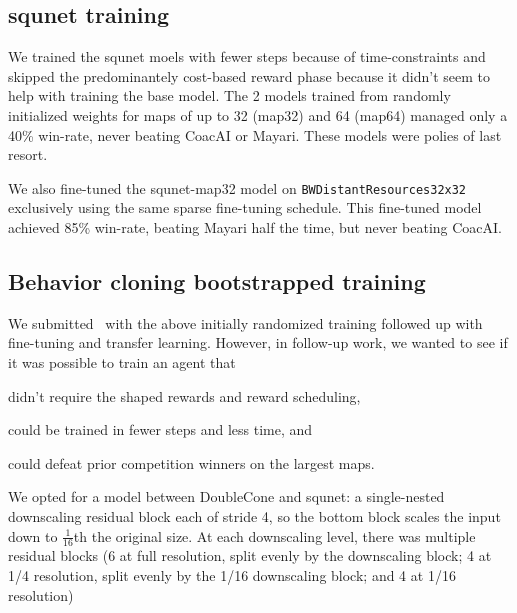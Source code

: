 \documentclass{article}
\begin{document}
\subsection{squnet training}
We trained the squnet moels with fewer steps because of time-constraints and skipped the
predominantely cost-based reward phase because it didn't seem to help with training the
base model. The 2 models trained from randomly initialized weights for maps of up to 32 (map32)
and 64 (map64) managed only a 40\% win-rate, never beating CoacAI or Mayari. These
models were polies of last resort.

We also fine-tuned the squnet-map32 model on \texttt{BWDistantResources32x32}
exclusively using the same sparse fine-tuning schedule. This fine-tuned model achieved
85\% win-rate, beating Mayari half the time, but never beating CoacAI.

\subsection{Behavior cloning bootstrapped training}
We submitted \agentName\ with the above initially randomized training followed up with
fine-tuning and transfer learning. However, in follow-up work, we wanted to see if it
was possible to train an agent that
\begin{inparaenum}[(1)]
    \item didn't require the shaped rewards and reward scheduling,
    \item could be trained in fewer steps and less time, and
    \item could defeat prior competition winners on the largest maps.
\end{inparaenum}
We opted for a model between DoubleCone and squnet: a single-nested downscaling residual
block each of stride 4, so the bottom block scales the input down to $\frac{1}{16}$th the original
size. At each downscaling level, there was multiple residual blocks (6 at full
resolution, split evenly by the downscaling block; 4 at 1/4 resolution, split evenly by
the 1/16 downscaling block; and 4 at 1/16 resolution)




\clearpage

\appendix
\end{document}
